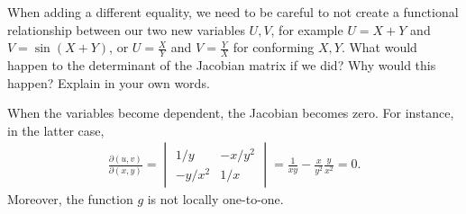 \begin{exercise}
When adding a different equality, we need to be careful to not create a functional relationship between our two new variables $U,V$, for example $U=X+Y$ and $V=\sin(X+Y)$, or $U=\frac X Y$ and $V = \frac Y X$ for conforming $X,Y$.
What would happen to the determinant of the Jacobian matrix if we did?
Why would this happen?
Explain in your own words.
\begin{solution}
  When the variables become dependent, the Jacobian becomes zero. For instance,  in the latter case,
\begin{align}
\frac{\partial (u,v)}{\partial (x, y)} =
  \begin{vmatrix}
    1/y & -x/y^{2} \\
-y/x^{2} & 1/x
  \end{vmatrix} = \frac{1}{x y} - \frac{x}{y^2}\frac{y}{x^{2}} = 0.
\end{align}
Moreover, the function $g$ is not locally one-to-one.

\end{solution}
\end{exercise}


